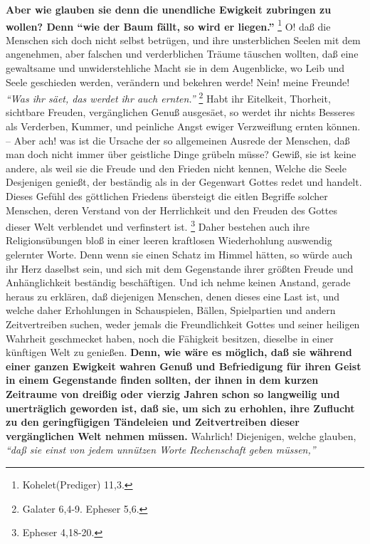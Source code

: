 \textbf{Aber wie glauben sie denn die unendliche Ewigkeit zubringen zu wollen? Denn
"`wie der Baum fällt, so wird er liegen."'}
\footnote{Kohelet(Prediger) 11,3. }
O! daß die Menschen sich doch nicht selbst
betrügen, und ihre unsterblichen Seelen mit dem angenehmen, aber falschen und
verderblichen Träume täuschen wollten, daß eine gewaltsame und unwiderstehliche
Macht sie in dem Augenblicke, wo Leib und Seele geschieden werden, verändern und
bekehren werde! Nein! meine Freunde!
\textit{"`Was ihr säet, das werdet ihr auch ernten."'}
\footnote{Galater 6,4-9. Epheser 5,6.}
Habt ihr Eitelkeit, Thorheit,
sichtbare Freuden, vergänglichen Genuß ausgesäet, so werdet ihr nichts Besseres
als Verderben, Kummer, und peinliche Angst ewiger Verzweiflung ernten können. --
Aber ach! was ist die Ursache der so allgemeinen Ausrede der Menschen, daß man
doch nicht immer über geistliche Dinge grübeln müsse? Gewiß, sie ist keine
andere, als weil sie die Freude und den Frieden nicht kennen, Welche die Seele
Desjenigen genießt, der beständig als in der Gegenwart Gottes redet und handelt.
Dieses Gefühl des göttlichen Friedens übersteigt die eitlen Begriffe solcher
Menschen, deren Verstand von der Herrlichkeit und den Freuden des Gottes dieser
Welt verblendet und verfinstert ist.
\footnote{Epheser 4,18-20.}
Daher bestehen
auch ihre Religionsübungen bloß in einer leeren kraftlosen Wiederhohlung
auswendig gelernter Worte. Denn wenn sie einen Schatz im Himmel hätten, so würde
auch ihr Herz daselbst sein, und sich mit dem Gegenstande ihrer größten Freude
und Anhänglichkeit beständig beschäftigen. Und ich nehme keinen Anstand, gerade
heraus zu erklären, daß diejenigen Menschen, denen dieses eine Last ist, und
welche daher Erhohlungen in Schauspielen, Bällen, Spielpartien und andern
Zeitvertreiben suchen, weder jemals die Freundlichkeit Gottes und seiner
heiligen Wahrheit geschmecket haben, noch die Fähigkeit besitzen, dieselbe in
einer künftigen Welt zu genießen. \textbf{Denn, wie wäre es möglich, daß sie während
einer ganzen Ewigkeit wahren Genuß und Befriedigung für ihren Geist in einem
Gegenstande finden sollten, der ihnen in dem kurzen Zeitraume von dreißig oder
vierzig Jahren schon so langweilig und unerträglich geworden ist, daß sie, um
sich zu erhohlen, ihre Zuflucht zu den geringfügigen Tändeleien und
Zeitvertreiben dieser vergänglichen Welt nehmen müssen.} Wahrlich! Diejenigen,
welche glauben,
\textit{"`daß sie einst von jedem unnützen Worte Rechenschaft geben
müssen,"'}
